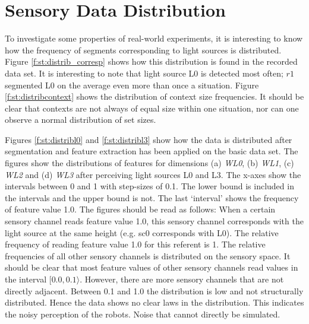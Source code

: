 \chapter{Sensory Data Distribution}\label{a:dataset}

To investigate some properties of real-world experiments, it is interesting to know how the frequency of segments corresponding to light sources is distributed. Figure \ref{f:st:distrib_corresp} shows how this distribution is found in the recorded data set. It is interesting to note that light source L0 is detected most often; $r1$ segmented L0 on the average even more than once a situation. Figure \ref{f:st:distribcontext} shows the distribution of context size frequencies. It should be clear that contexts are not always of equal size within one situation, nor can one observe a normal distribution of set sizes.

Figures \ref{f:st:distribl0} and \ref{f:st:distribl3} show how the data is distributed after segmentation and feature extraction has been applied on the basic data set. The figures show the distributions of features for dimensions (a) {\em WL0}, (b) {\em WL1}, (c) {\em WL2} and (d) {\em WL3} after perceiving light sources L0 and L3. The x-axes show the intervals between 0 and 1 with step-sizes of 0.1. The lower bound is included in the intervals and the upper bound is not. The last `interval' shows the frequency of feature value 1.0. The figures should be read as follows: When a certain sensory channel reads feature value 1.0, this sensory channel corresponds with the light source at the same height (e.g. sc0 corresponds with L0). The relative frequency of reading feature value 1.0 for this referent is 1. The relative frequencies of all other sensory channels is distributed on the sensory space. It should be clear that most feature values of other sensory channels read values in the interval $[0.0,0.1\rangle$. 
However, there are more sensory channels that are not directly adjacent. Between 0.1 and 1.0 the distribution is low and not structurally distributed. Hence the data shows no clear laws in the distribution. This indicates the noisy perception of the robots. Noise that cannot directly be simulated.

